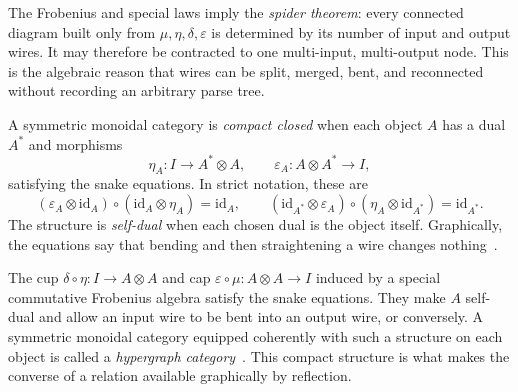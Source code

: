 The Frobenius and special laws imply the \emph{spider theorem}: every connected
diagram built only from $\mu,\eta,\delta,\varepsilon$ is determined by its
number of input and output wires.  It may therefore be contracted to one
multi-input, multi-output node.  This is the algebraic reason that wires can be
split, merged, bent, and reconnected without recording an arbitrary parse
tree.

\begin{definition}\label{appendix:compact-closed}
A symmetric monoidal category is \emph{compact closed} when each object $A$
has a dual $A^*$ and morphisms
\[
 \eta_A:I\to A^*\otimes A,
 \qquad \varepsilon_A:A\otimes A^*\to I,
\]
satisfying the snake equations. In strict notation, these are
\[
 (\varepsilon_A\otimes\mathrm{id}_A)
 \circ(\mathrm{id}_A\otimes\eta_A)=\mathrm{id}_A,
 \qquad
 (\mathrm{id}_{A^*}\otimes\varepsilon_A)
 \circ(\eta_A\otimes\mathrm{id}_{A^*})=\mathrm{id}_{A^*}.
\]
The structure is \emph{self-dual} when each chosen dual is the object itself.
Graphically, the equations say that bending and then straightening a wire
changes nothing~\cite{selinger2010survey}.
\end{definition}

The cup $\delta\circ\eta:I\to A\otimes A$ and cap
$\varepsilon\circ\mu:A\otimes A\to I$ induced by a special commutative
Frobenius algebra satisfy the snake equations.  They make $A$ self-dual and allow an
input wire to be bent into an output wire, or conversely.  A symmetric monoidal
category equipped coherently with such a structure on each object is called a
\emph{hypergraph category}~\cite{fong2019hypergraph}.  This compact structure
is what makes the converse of a relation available graphically by reflection.


